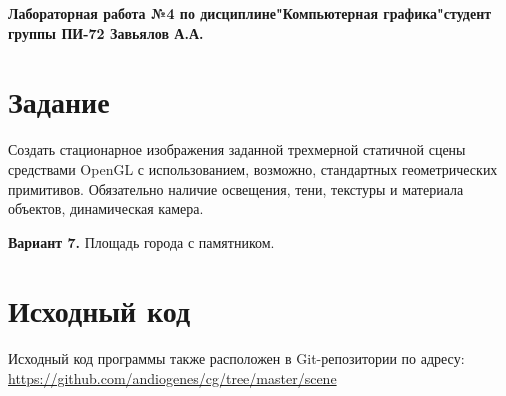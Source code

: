 \documentclass[a4paper,12pt]{article}
\begin{document}

\begin{center}
  \textbf{Лабораторная работа №4 по дисциплине\linebreak"Компьютерная графика"\linebreak{} студент группы ПИ-72 Завьялов А.А.}\\
\end{center}

\section{\normalsize{Задание}}
\begin{flushleft}
    Создать стационарное изображения  заданной трехмерной статичной сцены средствами OpenGL с использованием, возможно, стандартных геометрических примитивов.
    Обязательно наличие освещения, тени, текстуры и материала объектов, динамическая камера.
\end{flushleft}

\begin{flushleft}
  \textbf{Вариант 7.} Площадь города с памятником.
\end{flushleft}

\section{\normalsize{Исходный код}}
Исходный код программы также расположен в Git-репозитории по адресу: \url{https://github.com/andiogenes/cg/tree/master/scene}
\inputminted[breaklines]{c}{../main.c}
\end{document}
